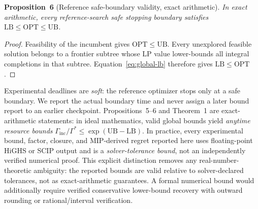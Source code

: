 \documentclass[11pt]{article}
\newcommand{\OPT}{\mathrm{OPT}}
\newcommand{\LB}{\mathrm{LB}}
\newcommand{\UB}{\mathrm{UB}}
\begin{document}
\textbf{Proposition~6} (Reference safe-boundary validity, exact arithmetic). \textit{In exact arithmetic, every reference-search safe stopping boundary satisfies $\LB\leq\OPT\leq\UB$.}

\begin{proof} Feasibility of the incumbent gives $\OPT\leq\UB$. Every unexplored feasible solution belongs to a frontier subtree whose LP value lower-bounds all integral completions in that subtree. Equation~\eqref{eq:global-lb} therefore gives $\LB\leq\OPT$.\end{proof}

Experimental deadlines are \emph{soft}: the reference optimizer stops only at a safe boundary. We report the actual boundary time and never assign a later bound report to an earlier checkpoint. Propositions~5--6 and Theorem~1 are exact-arithmetic statements: in ideal mathematics, valid global bounds yield \emph{anytime resource bounds} $\Gamma_{\mathrm{inc}}/\Gamma^*\le\exp(\UB-\LB)$. In practice, every experimental bound, factor, closure, and MIP-derived regret reported here uses floating-point HiGHS or SCIP output and is a \emph{solver-tolerance bound}, not an independently verified numerical proof. This explicit distinction removes any real-number-theoretic ambiguity: the reported bounds are valid relative to solver-declared tolerances, not as exact-arithmetic guarantees. A formal numerical bound would additionally require verified conservative lower-bound recovery with outward rounding or rational/interval verification.
\end{document}
